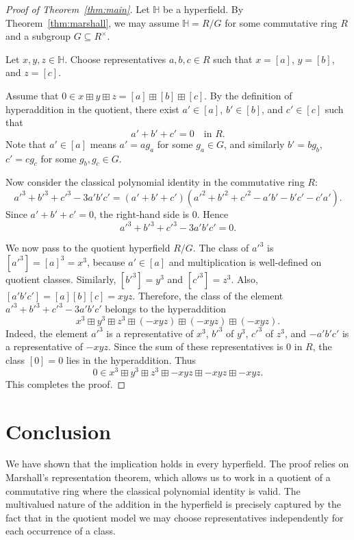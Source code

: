 \documentclass[11pt]{article}
\begin{document}
\begin{proof}[Proof of Theorem~\ref{thm:main}]
Let $\mathbb{H}$ be a hyperfield. By Theorem~\ref{thm:marshall}, we may assume
$\mathbb{H} = R/G$ for some commutative ring $R$ and a subgroup $G \subseteq R^\times$.

Let $x,y,z \in \mathbb{H}$. Choose representatives $a,b,c \in R$ such that
$x = [a]$, $y = [b]$, and $z = [c]$.

Assume that $0 \in x \boxplus y \boxplus z = [a] \boxplus [b] \boxplus [c]$.
By the definition of hyperaddition in the quotient, there exist $a' \in [a]$,
$b' \in [b]$, and $c' \in [c]$ such that
\[
a' + b' + c' = 0 \quad \text{in } R.
\]
Note that $a' \in [a]$ means $a' = a g_a$ for some $g_a \in G$, and similarly
$b' = b g_b$, $c' = c g_c$ for some $g_b, g_c \in G$.

Now consider the classical polynomial identity in the commutative ring $R$:
\[
a'^3 + b'^3 + c'^3 - 3a'b'c' = (a' + b' + c')(a'^2 + b'^2 + c'^2 - a'b' - b'c' - c'a').
\]
Since $a' + b' + c' = 0$, the right-hand side is $0$. Hence
\[
a'^3 + b'^3 + c'^3 - 3a'b'c' = 0.
\]

We now pass to the quotient hyperfield $R/G$. The class of $a'^3$ is
$[a'^3] = [a]^3 = x^3$, because $a' \in [a]$ and multiplication is well-defined on
quotient classes. Similarly, $[b'^3] = y^3$ and $[c'^3] = z^3$.
Also, $[a'b'c'] = [a][b][c] = xyz$. Therefore, the class of the element
$a'^3 + b'^3 + c'^3 - 3a'b'c'$ belongs to the hyperaddition
\[
x^3 \boxplus y^3 \boxplus z^3 \boxplus (-xyz) \boxplus (-xyz) \boxplus (-xyz).
\]
Indeed, the element $a'^3$ is a representative of $x^3$, $b'^3$ of $y^3$,
$c'^3$ of $z^3$, and $-a'b'c'$ is a representative of $-xyz$. Since the sum of these
representatives is $0$ in $R$, the class $[0] = 0$ lies in the hyperaddition.
Thus
\[
0 \in x^3 \boxplus y^3 \boxplus z^3 \boxplus -xyz \boxplus -xyz \boxplus -xyz.
\]
This completes the proof.
\end{proof}

\section{Conclusion}

We have shown that the implication holds in every hyperfield. The proof relies on
Marshall's representation theorem, which allows us to work in a quotient of a
commutative ring where the classical polynomial identity is valid. The multivalued
nature of the addition in the hyperfield is precisely captured by the fact that in the
quotient model we may choose representatives independently for each occurrence of a
class.
\end{document}
